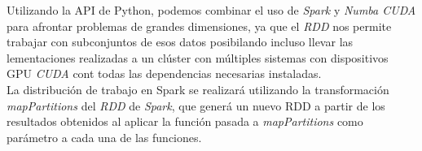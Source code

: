 Utilizando la API de Python, podemos combinar el uso de \textit{Spark} y \textit{Numba CUDA} para afrontar problemas de grandes dimensiones, ya que el \textit{RDD} nos permite trabajar con subconjuntos de esos datos posibilando incluso llevar las lementaciones realizadas a un clúster con múltiples sistemas con dispositivos GPU \textit{CUDA} cont todas las dependencias necesarias instaladas. \\

La distribución de trabajo en Spark se realizará utilizando la transformación \textit{mapPartitions} del \textit{RDD} de \textit{Spark}, que generá un nuevo RDD a partir de los resultados obtenidos al aplicar la función pasada a \textit{mapPartitions} como parámetro a cada una de las funciones.

